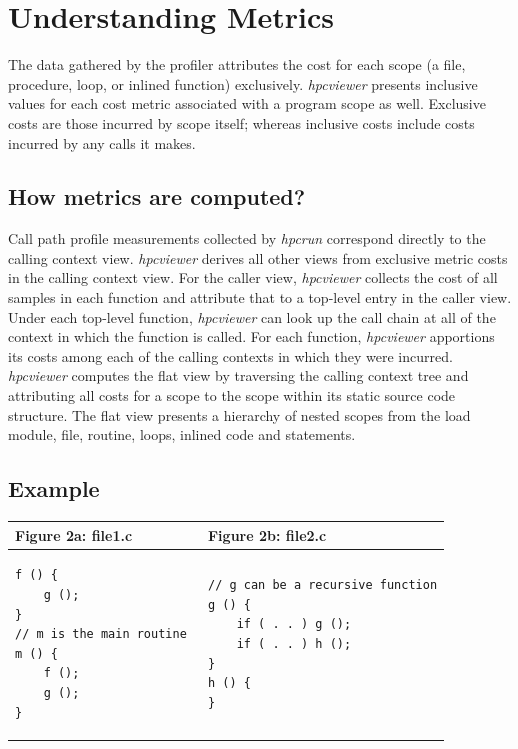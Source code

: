 \documentclass[a4paper,11pt]{article}
\begin{document}
\section{Understanding Metrics}

 The data gathered by the profiler attributes the cost for each scope (a file, procedure, loop, or inlined function) exclusively.  \textit{hpcviewer} presents inclusive values for each cost metric associated with a program scope as well.  Exclusive costs are those incurred by scope itself; whereas inclusive costs include costs incurred by  any calls it makes.  

\subsection{How metrics are computed?}

Call path profile measurements collected by \textit{hpcrun} correspond directly to the calling context view. \textit{hpcviewer}  derives all other views from exclusive metric costs in the calling context view. For the caller view, \textit{hpcviewer} collects the  cost of all samples in each function and attribute that to a top-level entry in the caller view. Under each top-level  function, \textit{hpcviewer} can look up the call chain at all of the context in which the function is called. For each function, \textit{hpcviewer}  apportions its costs among each of the calling contexts in which they were incurred. \textit{hpcviewer} computes the flat view by  traversing the calling context tree and attributing all costs for a scope to the scope within its static source code  structure. The flat view presents a hierarchy of nested scopes from the load module, file, routine, loops, inlined  code and statements.  

\subsection{Example}
\begin{center}
\begin{tabular}{|p{3in}|p{3in}|}\hline
\textbf{Figure 2a: file1.c} & \textbf{Figure 2b: file2.c} \\\hline 
\begin{verbatim}
f () { 
 	g (); 
} 
// m is the main routine 
m () { 
 	f (); 
 	g (); 
} 
\end{verbatim} & 
\begin{verbatim}
// g can be a recursive function
g () { 
	if ( . . ) g (); 
	if ( . . ) h (); 
} 
h () { 
} 
\end{verbatim}\\\hline
\end{tabular}
\end{center}
\end{document}
